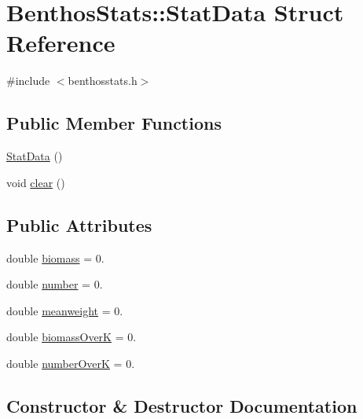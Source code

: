 \hypertarget{struct_benthos_stats_1_1_stat_data}{}\section{Benthos\+Stats\+::Stat\+Data Struct Reference}
\label{struct_benthos_stats_1_1_stat_data}


{\ttfamily \#include $<$benthosstats.\+h$>$}

\subsection*{Public Member Functions}
\begin{DoxyCompactItemize}
\item 
\mbox{\hyperlink{struct_benthos_stats_1_1_stat_data_a259c0353f2e6cee0e8ee1573575b471c}{Stat\+Data}} ()
\item 
void \mbox{\hyperlink{struct_benthos_stats_1_1_stat_data_a80d20ec4926b1d62bf4c7260bc4d6c44}{clear}} ()
\end{DoxyCompactItemize}
\subsection*{Public Attributes}
\begin{DoxyCompactItemize}
\item 
double \mbox{\hyperlink{struct_benthos_stats_1_1_stat_data_a7b561b09cf99461e0a4432c89c64b17c}{biomass}} = 0.
\item 
double \mbox{\hyperlink{struct_benthos_stats_1_1_stat_data_a525ddb24d67ba1db3558c6f1530175b3}{number}} = 0.
\item 
double \mbox{\hyperlink{struct_benthos_stats_1_1_stat_data_a3cd5403b1c7d822061641697dcab1ac1}{meanweight}} = 0.
\item 
double \mbox{\hyperlink{struct_benthos_stats_1_1_stat_data_aa76cbea868f7d7f1e95688cbb911c028}{biomass\+OverK}} = 0.
\item 
double \mbox{\hyperlink{struct_benthos_stats_1_1_stat_data_abcb2b3d406a2b522279c9a12d789d30f}{number\+OverK}} = 0.
\end{DoxyCompactItemize}


\subsection{Constructor \& Destructor Documentation}
\mbox{\label{struct_benthos_stats_1_1_stat_data_a259c0353f2e6cee0e8ee1573575b471c}} 
